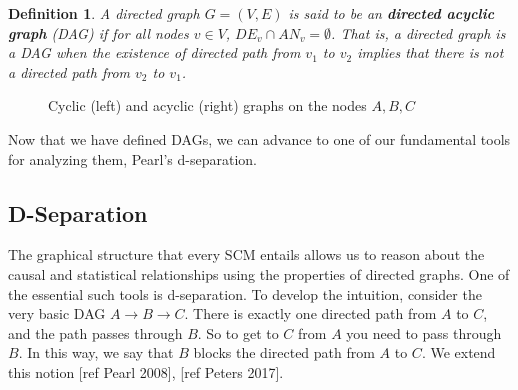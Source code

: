 \documentclass[12pt]{article}
\newtheorem{definition}{Definition}[section]
\theoremstyle{definition}
\begin{document}
\begin{definition}
A directed graph $G = (V,E)$ is said to be an \emph{\textbf{directed acyclic graph}} (DAG) if for all nodes $v \in V$, $DE_v \cap AN_v = \emptyset$. That is, a directed graph is a DAG when the existence of directed path from $v_1$ to $v_2$ implies that there is not a directed path from $v_2$ to $v_1$.
\end{definition}

\begin{figure}
\centering
{}

\caption{Cyclic (left) and acyclic (right) graphs on the nodes $A,B,C$} \label{fig:M1}
\end{figure}

Now that we have defined DAGs, we can advance to one of our fundamental tools for analyzing them, Pearl's d-separation.

\subsection{D-Separation}
The graphical structure that every SCM entails allows us to reason about the causal and statistical relationships using the properties of directed graphs. One of the essential such tools is d-separation. To develop the intuition, consider the very basic DAG $A \rightarrow B \rightarrow C$. There is exactly one directed path from $A$ to $C$, and the path passes through $B$. So to get to $C$ from $A$ you need to pass through $B$. In this way, we say that $B$ blocks the directed path from $A$ to $C$. We extend this notion [ref Pearl 2008], [ref Peters 2017].
\end{document}
